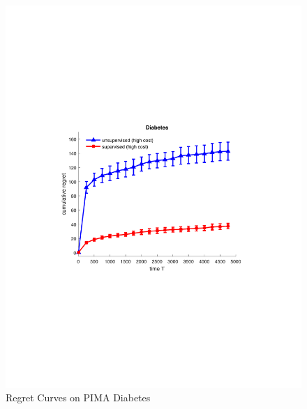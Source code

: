 \documentclass[11pt]{article} %
\begin{document}
\begin{center}
\begin{figure}
	\begin{minipage}{8cm}
		\centering
		\includegraphics[scale=0.5]{Diabetes_WD1}
		\vspace{-.3cm}
		\caption{\footnotesize Regret Curves on PIMA Diabetes}
		\label{fig:Diabetes}
	\end{minipage}
	\begin{minipage}{8cm}
		\centering

\end{minipage}
\end{figure}
\end{center}
\end{document}
